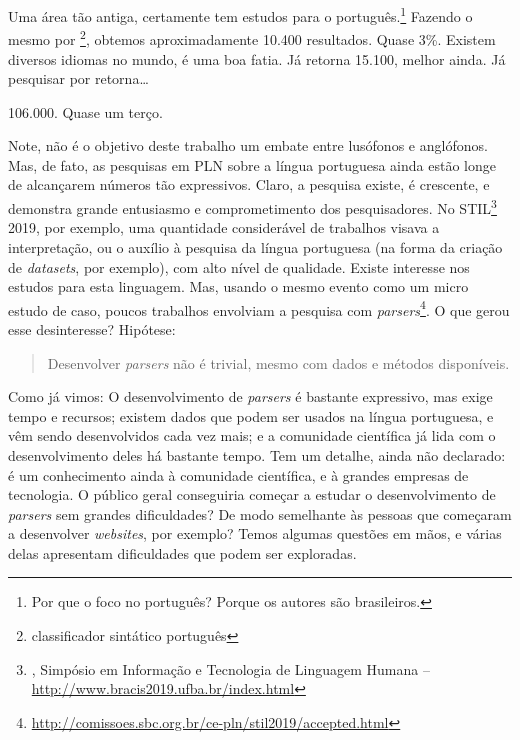 Uma área tão antiga, certamente tem estudos para o português.\footnote{Por que o foco no português? Porque os autores são brasileiros.} Fazendo o mesmo  por \footnote{classificador sintático português}, obtemos aproximadamente 10.400 resultados. Quase 3\%.
Existem diversos idiomas no mundo, é uma boa fatia.
Já  retorna 15.100, melhor ainda. Já pesquisar por   retorna\ldots

106.000. Quase um terço.

Note, não é o objetivo deste trabalho um embate entre lusófonos e anglófonos. Mas, de fato, as pesquisas em PLN sobre a língua portuguesa ainda estão longe de alcançarem números tão expressivos. Claro, a pesquisa existe, é crescente, e demonstra grande entusiasmo e comprometimento dos pesquisadores. No STIL\footnote{, Simpósio em Informação e Tecnologia de Linguagem Humana --  \url{http://www.bracis2019.ufba.br/index.html}} 2019, por exemplo, uma quantidade considerável de trabalhos visava a interpretação, ou o auxílio à pesquisa da língua portuguesa (na forma da criação de \textit{datasets}, por exemplo), com alto nível de qualidade. Existe interesse nos estudos para esta linguagem. Mas, usando o mesmo evento como um micro estudo de caso, poucos trabalhos envolviam a pesquisa com \textit{parsers}\footnote{\url{http://comissoes.sbc.org.br/ce-pln/stil2019/accepted.html}}. O que gerou esse desinteresse? Hipótese:
\begin{quote}
    Desenvolver \textit{parsers} não é trivial, mesmo com dados e métodos disponíveis.
\end{quote}

Como já vimos: O desenvolvimento de \textit{parsers} é bastante expressivo, mas exige tempo e recursos; existem dados que podem ser usados na língua portuguesa, e vêm sendo desenvolvidos cada vez mais; e a comunidade científica já lida com o desenvolvimento deles há bastante tempo. Tem um detalhe, ainda não declarado: é um conhecimento ainda  à comunidade científica, e à grandes empresas de tecnologia. 
O público geral conseguiria começar a estudar o desenvolvimento de \textit{parsers} sem grandes dificuldades? De modo semelhante às pessoas que começaram a desenvolver \textit{websites}, por exemplo?
Temos algumas questões em mãos, e várias delas apresentam dificuldades que podem ser exploradas.

